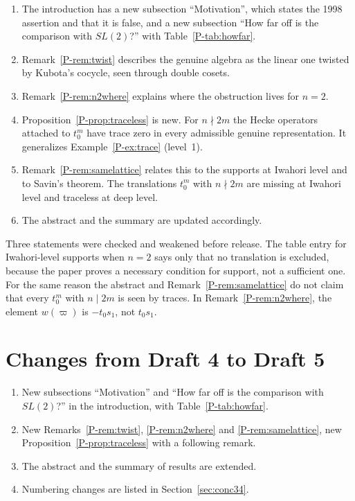 \documentclass[12pt,letterpaper]{amsart}
\begin{document}
\begin{enumerate}[leftmargin=1.5em]
\item The introduction has a new subsection ``Motivation'', which
states the 1998 assertion and that it is false, and a new subsection
``How far off is the comparison with $SL(2)$?'' with
Table~\ref{P-tab:howfar}.
\item Remark~\ref{P-rem:twist} describes the genuine algebra as the
linear one twisted by Kubota's cocycle, seen through double cosets.
\item Remark~\ref{P-rem:n2where} explains where the obstruction lives
for $n=2$.
\item Proposition~\ref{P-prop:traceless} is new. For $n\nmid 2m$ the
Hecke operators attached to $t_0^m$ have trace zero in every admissible
genuine representation. It generalizes Example~\ref{P-ex:trace}
(level~1).
\item Remark~\ref{P-rem:samelattice} relates this to the supports at
Iwahori level and to Savin's theorem. The translations $t_0^m$ with
$n\nmid 2m$ are missing at Iwahori level and traceless at deep level.
\item The abstract and the summary are updated accordingly.
\end{enumerate}

\noindent
Three statements were checked and weakened before release. The table
entry for Iwahori-level supports when $n=2$ says only that no
translation is excluded, because the paper proves a necessary condition
for support, not a sufficient one. For the same reason the abstract and
Remark~\ref{P-rem:samelattice} do not claim that every $t_0^m$ with
$n\mid 2m$ is seen by traces. In Remark~\ref{P-rem:n2where}, the element
$w(\varpi)$ is $-t_0s_1$, not $t_0s_1$.

\section{Changes from Draft 4 to Draft 5}

\begin{enumerate}[leftmargin=1.5em]
\item New subsections ``Motivation'' and ``How far off is the
comparison with $SL(2)$?'' in the introduction, with
Table~\ref{P-tab:howfar}.
\item New Remarks~\ref{P-rem:twist}, \ref{P-rem:n2where} and
\ref{P-rem:samelattice}, new Proposition~\ref{P-prop:traceless} with a
following remark.
\item The abstract and the summary of results are extended.
\item Numbering changes are listed in Section~\ref{sec:conc34}.
\end{enumerate}
\end{document}
